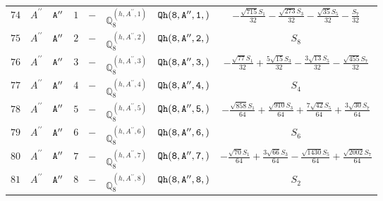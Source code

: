 \documentclass[fleqn,8pt]{jsarticle}
\begin{document}
\begin{table}[ht!]
\begin{center}
\begin{tabular}{cccccccc}
$ 74 $ & $ A^{\prime\prime} $ & $ {\tt A''} $ & $ 1 $ & $ - $ & $ \mathbb{Q}_{8}^{(h,A^{\prime\prime},1)} $ & $ {\tt Qh(8,A'',1,)} $ & $ - \frac{\sqrt{715} S_{1}}{32} - \frac{\sqrt{273} S_{3}}{32} - \frac{\sqrt{35} S_{5}}{32} - \frac{S_{7}}{32} $ \\
$ 75 $ & $ A^{\prime\prime} $ & $ {\tt A''} $ & $ 2 $ & $ - $ & $ \mathbb{Q}_{8}^{(h,A^{\prime\prime},2)} $ & $ {\tt Qh(8,A'',2,)} $ & $ S_{8} $ \\
$ 76 $ & $ A^{\prime\prime} $ & $ {\tt A''} $ & $ 3 $ & $ - $ & $ \mathbb{Q}_{8}^{(h,A^{\prime\prime},3)} $ & $ {\tt Qh(8,A'',3,)} $ & $ - \frac{\sqrt{77} S_{1}}{32} + \frac{5 \sqrt{15} S_{3}}{32} - \frac{3 \sqrt{13} S_{5}}{32} - \frac{\sqrt{455} S_{7}}{32} $ \\
$ 77 $ & $ A^{\prime\prime} $ & $ {\tt A''} $ & $ 4 $ & $ - $ & $ \mathbb{Q}_{8}^{(h,A^{\prime\prime},4)} $ & $ {\tt Qh(8,A'',4,)} $ & $ S_{4} $ \\
$ 78 $ & $ A^{\prime\prime} $ & $ {\tt A''} $ & $ 5 $ & $ - $ & $ \mathbb{Q}_{8}^{(h,A^{\prime\prime},5)} $ & $ {\tt Qh(8,A'',5,)} $ & $ - \frac{\sqrt{858} S_{1}}{64} + \frac{\sqrt{910} S_{3}}{64} + \frac{7 \sqrt{42} S_{5}}{64} + \frac{3 \sqrt{30} S_{7}}{64} $ \\
$ 79 $ & $ A^{\prime\prime} $ & $ {\tt A''} $ & $ 6 $ & $ - $ & $ \mathbb{Q}_{8}^{(h,A^{\prime\prime},6)} $ & $ {\tt Qh(8,A'',6,)} $ & $ S_{6} $ \\
$ 80 $ & $ A^{\prime\prime} $ & $ {\tt A''} $ & $ 7 $ & $ - $ & $ \mathbb{Q}_{8}^{(h,A^{\prime\prime},7)} $ & $ {\tt Qh(8,A'',7,)} $ & $ - \frac{\sqrt{70} S_{1}}{64} + \frac{3 \sqrt{66} S_{3}}{64} - \frac{\sqrt{1430} S_{5}}{64} + \frac{\sqrt{2002} S_{7}}{64} $ \\
$ 81 $ & $ A^{\prime\prime} $ & $ {\tt A''} $ & $ 8 $ & $ - $ & $ \mathbb{Q}_{8}^{(h,A^{\prime\prime},8)} $ & $ {\tt Qh(8,A'',8,)} $ & $ S_{2} $ \\
 \hline \hline
\end{tabular}
\end{center}
\end{table}
\end{document}

